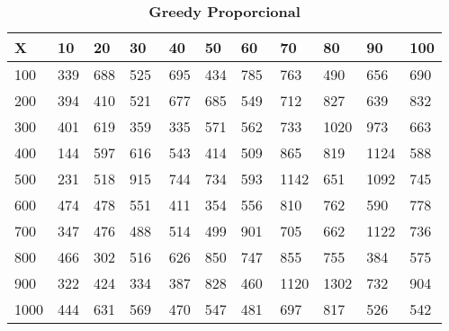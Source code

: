 \documentclass[10pt,letterpaper]{article}
\begin{document}
\begin{center}
\begin{table}\renewcommand{\arraystretch}{2.5}
\caption{\large \textbf{Greedy Proporcional}}
\centering
\begin{tabular} { |m{0.5cm}|m{1.3cm}|m{1.3cm}|m{1.3cm}|m{1.3cm}|m{1.3cm}|m{1.3cm}|m{1.3cm}|m{1.3cm}|m{1.3cm}|m{1.3cm}|} 
\hline
\rowcolor{Gray}
\centering \textbf{X} & \centering \textbf{10} & \centering \textbf{20} & \centering \textbf{30}\ & \centering \textbf{40} & \centering \textbf{50} & \centering \textbf{60}\ & \centering \textbf{70} & \centering \textbf{80} & \centering \textbf{90}\ & \textbf{100} \\\hline
\cellcolor{Gray}100 & \Large 339 & \Large 688 & \Large 525 & \Large 695 & \Large 434 & \Large 785 & \Large 763 & \Large 490 & \Large 656 & \Large 690 \\
\hline
\cellcolor{Gray}200 & \Large 394 & \Large 410 & \Large 521 & \Large 677 & \Large 685 & \Large 549 & \Large 712 & \Large 827 & \Large 639 & \Large 832 \\
\hline
\cellcolor{Gray}300 & \Large 401 & \Large 619 & \Large 359 & \Large 335 & \Large 571 & \Large 562 & \Large 733 & \Large 1020 & \Large 973 & \Large 663 \\
\hline
\cellcolor{Gray}400 & \Large 144 & \Large 597 & \Large 616 & \Large 543 & \Large 414 & \Large 509 & \Large 865 & \Large 819 & \Large 1124 & \Large 588 \\
\hline
\cellcolor{Gray}500 & \Large 231 & \Large 518 & \Large 915 & \Large 744 & \Large 734 & \Large 593 & \Large 1142 & \Large 651 & \Large 1092 & \Large 745 \\
\hline
\cellcolor{Gray}600 & \Large 474 & \Large 478 & \Large 551 & \Large 411 & \Large 354 & \Large 556 & \Large 810 & \Large 762 & \Large 590 & \Large 778 \\
\hline
\cellcolor{Gray}700 & \Large 347 & \Large 476 & \Large 488 & \Large 514 & \Large 499 & \Large 901 & \Large 705 & \Large 662 & \Large 1122 & \Large 736 \\
\hline
\cellcolor{Gray}800 & \Large 466 & \Large 302 & \Large 516 & \Large 626 & \Large 850 & \Large 747 & \Large 855 & \Large 755 & \Large 384 & \Large 575 \\
\hline
\cellcolor{Gray}900 & \Large 322 & \Large 424 & \Large 334 & \Large 387 & \Large 828 & \Large 460 & \Large 1120 & \Large 1302 & \Large 732 & \Large 904 \\
\hline
\cellcolor{Gray}1000 & \Large 444 & \Large 631 & \Large 569 & \Large 470 & \Large 547 & \Large 481 & \Large 697 & \Large 817 & \Large 526 & \Large 542 \\
\hline
\end{tabular} \\
\end{table}
\end{center}
\end{document}
